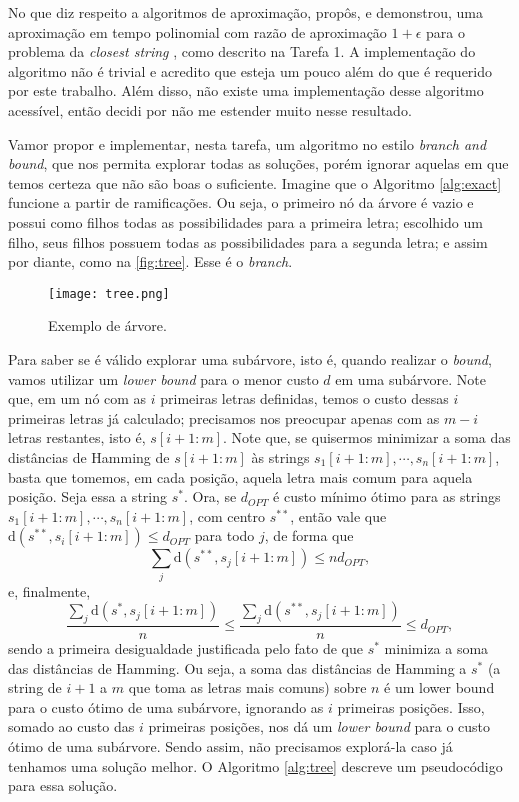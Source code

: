 No que diz respeito a algoritmos de aproximação, \citeauthor{li2002closest} propôs, e demonstrou, uma aproximação em tempo polinomial com razão de aproximação $1 + \epsilon$ para o problema da \textit{closest string} \cite{li2002closest}, como descrito na Tarefa 1.
A implementação do algoritmo não é trivial e acredito que esteja um pouco além do que é requerido por este trabalho. Além disso, não existe uma implementação desse algoritmo acessível, então decidi por não me estender muito nesse resultado.

Vamor propor e implementar, nesta tarefa, um algoritmo no estilo \textit{branch and bound}, que nos permita explorar todas as soluções, porém ignorar aquelas em que temos certeza que não são boas o suficiente. Imagine que o Algoritmo \ref{alg:exact} funcione a partir de ramificações. Ou seja, o primeiro nó da árvore é vazio e possui como filhos todas as possibilidades para a primeira letra; escolhido um filho, seus filhos possuem todas as possibilidades para a segunda letra; e assim por diante, como na \autoref{fig:tree}. Esse é o \textit{branch}.

\begin{figure}[H]
    \centering
    \texttt{[image: tree.png]}
    \caption{Exemplo de árvore.}
    \label{fig:tree}
\end{figure}

Para saber se é válido explorar uma subárvore, isto é, quando realizar o \textit{bound}, vamos utilizar um \textit{lower bound} para o menor custo $d$ em uma subárvore. Note que, em um nó com as $i$ primeiras letras definidas, temos o custo dessas $i$ primeiras letras já calculado; precisamos nos preocupar apenas com as $m-i$ letras restantes, isto é, $s[i+1:m]$. Note que, se quisermos minimizar a soma das distâncias de Hamming de $s[i+1:m]$ às strings $s_1[i+1:m], \cdots, s_n[i+1:m]$, basta que tomemos, em cada posição, aquela letra mais comum para aquela posição. Seja essa a string $s^\ast$. Ora, se $d_{OPT}$ é custo mínimo ótimo para as strings $s_1[i+1:m], \cdots, s_n[i+1:m]$, com centro $s^{\ast\ast}$, então vale que $\text{d}(s^{\ast\ast}, s_i[i+1:m]) \le d_{OPT}$ para todo $j$, de forma que
\[\sum_j \text{d}(s^{\ast\ast}, s_j[i+1:m]) \le n d_{OPT},\]
e, finalmente,
\[\frac{\sum_j \text{d}(s^{\ast}, s_j[i+1:m])}{n} \le \frac{\sum_j \text{d}(s^{\ast\ast}, s_j[i+1:m])}{n} \le d_{OPT},\]
sendo a primeira desigualdade justificada pelo fato de que $s^\ast$ minimiza a soma das distâncias de Hamming.
Ou seja, a soma das distâncias de Hamming a $s^\ast$ (a string de $i+1$ a $m$ que toma as letras mais comuns) sobre $n$ é um lower bound para o custo ótimo de uma subárvore, ignorando as $i$ primeiras posições. Isso, somado ao custo das $i$ primeiras posições, nos dá um \textit{lower bound} para o custo ótimo de uma subárvore. Sendo assim, não precisamos explorá-la caso já tenhamos uma solução melhor.
O Algoritmo \ref{alg:tree} descreve um pseudocódigo para essa solução.

